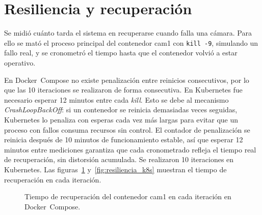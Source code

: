 \section{Resiliencia y recuperación}
\label{sec:resiliencia}

Se midió cuánto tarda el sistema en recuperarse cuando falla una cámara. Para
ello se mató el proceso principal del contenedor cam1 con \texttt{kill -9},
simulando un fallo real, y se cronometró el tiempo hasta que el contenedor
volvió a estar operativo.

En Docker~Compose no existe penalización entre reinicios consecutivos, por lo que
las 10 iteraciones se realizaron de forma consecutiva. En Kubernetes fue
necesario esperar 12 minutos entre cada \textit{kill}. Esto se debe al
mecanismo \textit{CrashLoopBackOff}: si un contenedor se reinicia demasiadas
veces seguidas, Kubernetes lo penaliza con esperas cada vez más largas para
evitar que un proceso con fallos consuma recursos sin control. El contador de
penalización se reinicia después de 10 minutos de funcionamiento estable, así
que esperar 12 minutos entre mediciones garantiza que cada cronometrado refleja
el tiempo real de recuperación, sin distorsión acumulada. Se realizaron
10 iteraciones en Kubernetes.
Las figuras~\ref{fig:resiliencia_docker} y~\ref{fig:resiliencia_k8s} muestran el tiempo de recuperación en cada iteración.

\begin{figure}[H]
  \centering
  \caption{Tiempo de recuperación del contenedor cam1 en cada iteración
           en Docker~Compose.}
  \label{fig:resiliencia_docker}
\end{figure}

